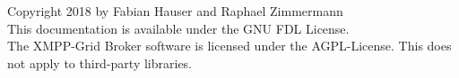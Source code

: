 \vspace*{\fill}

\noindent \textcopyright  Copyright 2018 by Fabian Hauser and Raphael Zimmermann\\

\noindent This documentation is available under the GNU FDL License. \\

\noindent The XMPP-Grid Broker software is licensed under the AGPL-License. This does not apply to third-party libraries.

\pagebreak





